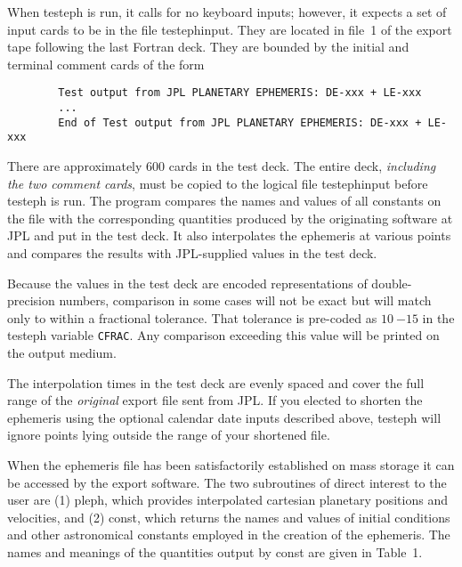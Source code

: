 When {\csc testeph} is run, it calls for no keyboard inputs; however,
it expects a set of input cards to be in the file {\csc testephinput}.
They are located in file~1 of the export tape following the last
Fortran deck. They are bounded by the initial and terminal
comment cards of the form
\begin{verbatim}
        Test output from JPL PLANETARY EPHEMERIS: DE-xxx + LE-xxx
        ...
        End of Test output from JPL PLANETARY EPHEMERIS: DE-xxx + LE-xxx
\end{verbatim}
 
There are approximately 600 cards in the test deck. The entire deck, {\it
including the two comment cards}, must be copied to the  logical file
{\csc testephinput} before {\csc testeph} is run. The program compares
the names and values of all constants on the file with the
corresponding quantities produced by the originating software at
JPL and put in the test deck. It also interpolates the ephemeris
at various points and compares the results with JPL-supplied values
in the test deck.
 
Because the values in the test deck are encoded representations of
double-precision numbers, comparison in some cases will
not be exact but will match only to within a fractional tolerance.
That tolerance
is pre-coded as $10~{-15}$ in the {\csc testeph} variable
{\tt CFRAC}. Any comparison exceeding this value will be
printed on the output medium.
 
The interpolation times in the test deck are evenly spaced
and cover the full range of the {\it original\/} export file sent from JPL.
If you elected to shorten the ephemeris using the optional calendar
date inputs described above, {\csc testeph}
will ignore points lying outside
the range of your shortened file.
 
When the ephemeris file has been satisfactorily established
on mass storage it can be accessed by the export software.
The two subroutines of direct interest to the user are
(1) {\csc pleph}, which provides interpolated
cartesian planetary positions and
velocities, and (2) {\csc const}, which returns the
names and values of initial conditions and other astronomical
constants employed in the creation of the ephemeris. The
names and meanings of the quantities output by {\csc const}
are given in Table~1.
 
